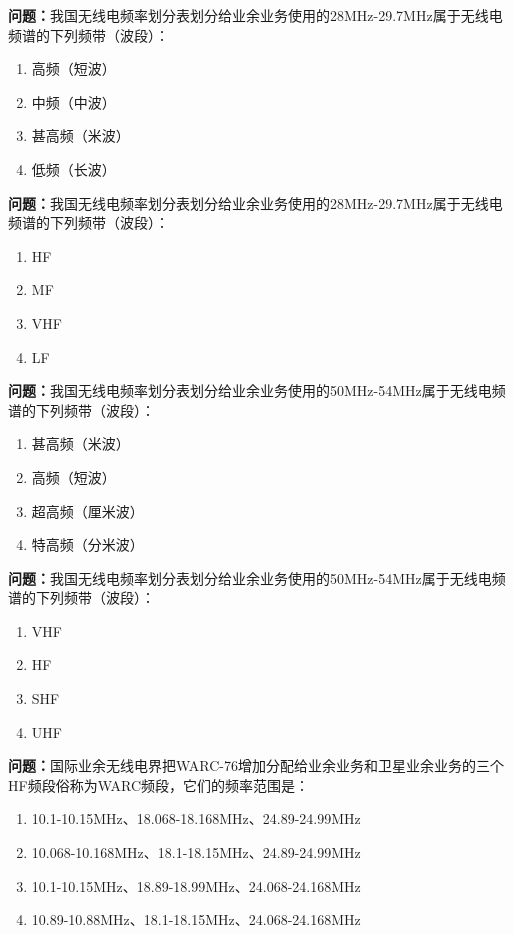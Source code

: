 \bigskip


\noindent\textbf{问题：}我国无线电频率划分表划分给业余业务使用的28MHz-29.7MHz属于无线电频谱的下列频带（波段）：
\begin{enumerate}[label=\Alph*), leftmargin=3em]
\item 高频（短波）
\item 中频（中波）
\item 甚高频（米波）
\item 低频（长波）
\end{enumerate}

\bigskip


\noindent\textbf{问题：}我国无线电频率划分表划分给业余业务使用的28MHz-29.7MHz属于无线电频谱的下列频带（波段）：
\begin{enumerate}[label=\Alph*), leftmargin=3em]
\item HF
\item MF
\item VHF
\item LF
\end{enumerate}

\bigskip


\noindent\textbf{问题：}我国无线电频率划分表划分给业余业务使用的50MHz-54MHz属于无线电频谱的下列频带（波段）：
\begin{enumerate}[label=\Alph*), leftmargin=3em]
\item 甚高频（米波）
\item 高频（短波）
\item 超高频（厘米波）
\item 特高频（分米波）
\end{enumerate}

\bigskip


\noindent\textbf{问题：}我国无线电频率划分表划分给业余业务使用的50MHz-54MHz属于无线电频谱的下列频带（波段）：
\begin{enumerate}[label=\Alph*), leftmargin=3em]
\item VHF
\item HF
\item SHF
\item UHF
\end{enumerate}

\bigskip


\noindent\textbf{问题：}国际业余无线电界把WARC-76增加分配给业余业务和卫星业余业务的三个HF频段俗称为WARC频段，它们的频率范围是：
\begin{enumerate}[label=\Alph*), leftmargin=3em]
\item 10.1-10.15MHz、18.068-18.168MHz、24.89-24.99MHz
\item 10.068-10.168MHz、18.1-18.15MHz、24.89-24.99MHz
\item 10.1-10.15MHz、18.89-18.99MHz、24.068-24.168MHz
\item 10.89-10.88MHz、18.1-18.15MHz、24.068-24.168MHz
\end{enumerate}


